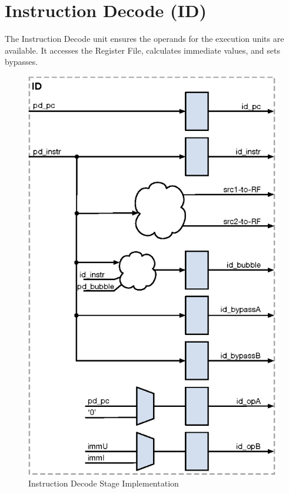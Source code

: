 \pagebreak

\section{Instruction Decode (ID)}\label{instruction-decode-id-1}

The Instruction Decode unit ensures the operands for the execution units are available.
It accesses the Register File, calculates immediate values, and sets bypasses.

\begin{figure}[h]
  \includegraphics{assets/img/Pipeline-ID}
  \caption{Instruction Decode Stage Implementation}
\end{figure}

